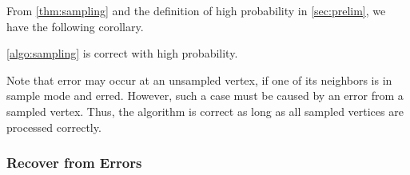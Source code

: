 {  %
  
  
  
  From \cref{thm:sampling} and the definition of high probability in \cref{sec:prelim}, we have the following corollary. 
  
  \begin{corollary}\label{cor:sampling}
    \cref{algo:sampling} is correct with high probability. 
  \end{corollary}
  \vspace{-0.05in}

Note that error may occur at an unsampled vertex, if one of its neighbors is in sample mode and erred. 
  However, such a case must be caused by an error from a sampled vertex. Thus, the algorithm is correct as long as all sampled vertices are processed correctly. 
}

\subsubsection{Recover from Errors}

